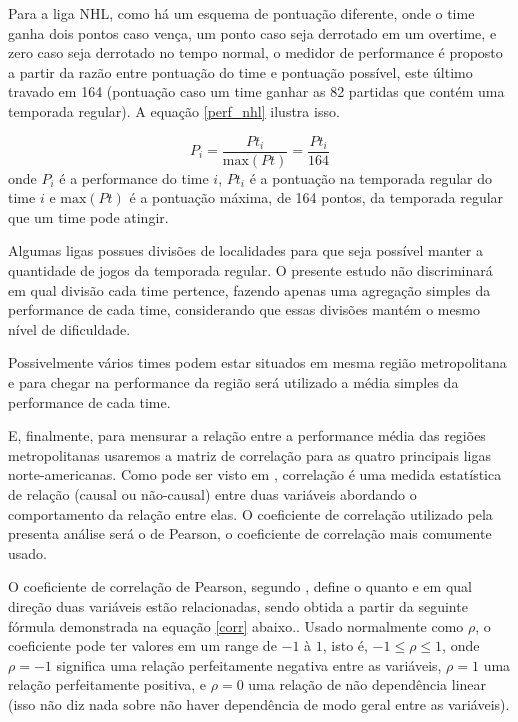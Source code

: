 \documentclass[12pt,oneside,a4paper,chapter=TITLE,english,brazil,sumario=abnt-6027-2012]{abntex2}
\begin{document}
	Para a liga NHL, como há um esquema de pontuação diferente, onde o time ganha dois pontos caso vença, um ponto caso seja derrotado em um overtime, e zero caso seja derrotado no tempo normal, o medidor de performance é proposto a partir da razão entre pontuação do time e pontuação possível, este último travado em 164 (pontuação caso um time ganhar as 82 partidas que contém uma temporada regular). A equação \ref{perf_nhl} ilustra isso.
	
	\begin{equation}
		P_i = \frac{Pt_i}{\mbox{max}(Pt)} = \frac{Pt_i}{164}
		\label{perf_nhl}
	\end{equation}
	onde $P_i$ é a performance do time $i$, $Pt_i$ é a pontuação na temporada regular do time $i$ e $\mbox{max}(Pt)$ é a pontuação máxima, de 164 pontos, da temporada regular que um time pode atingir.
	
	Algumas ligas possues divisões de localidades para que seja possível manter a quantidade de jogos da temporada regular. O presente estudo não discriminará em qual divisão cada time pertence, fazendo apenas uma agregação simples da performance de cada time, considerando que essas divisões mantém o mesmo nível de dificuldade.
	
	Possivelmente vários times podem estar situados em mesma região metropolitana e para chegar na performance da região será utilizado a média simples da performance de cada time.
	
	E, finalmente, para mensurar a relação entre a performance média das regiões metropolitanas usaremos a matriz de correlação para as quatro principais ligas norte-americanas. Como pode ser visto em , correlação é uma medida estatística de relação (causal ou não-causal) entre duas variáveis abordando o comportamento da relação entre elas. O coeficiente de correlação utilizado pela presenta análise será o de Pearson, o coeficiente de correlação mais comumente usado. 
	
	O coeficiente de correlação de Pearson, segundo , define o quanto e em qual direção duas variáveis estão relacionadas, sendo obtida a partir da seguinte fórmula demonstrada na equação \ref{corr} abaixo.. Usado normalmente como $\rho$, o coeficiente pode ter valores em um range de $-1$ à $1$, isto é, $-1 \leq \rho \leq 1$, onde $\rho =-1$ significa uma relação perfeitamente negativa entre as variáveis, $\rho=1$ uma relação perfeitamente positiva, e $\rho=0$ uma relação de não dependência linear (isso não diz nada sobre não haver dependência de modo geral entre as variáveis).
	
\end{document}
